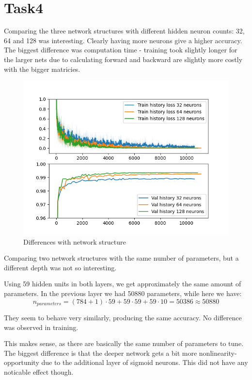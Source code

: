 \documentclass[a4paper]{article}
\begin{document}
\clearpage
\section*{Task4}
Comparing the three network structures with different hidden neuron counts: 32, 64 and 128 was interesting.
Clearly having more neurons give a higher accuracy. The biggest difference was computation time - training took slightly longer for the larger nets due to calculating forward and backward are slightly more costly with the bigger matricies.

\begin{figure}[h]
    \includegraphics[width=\linewidth]{code/neuron_count_comparison.png}
    \caption{Differences with network structure}
\end{figure}

\clearpage
Comparing two network structures with the same number of parameters, but a different depth was not so interesting.

Using 59 hidden units in both layers, we get approximately the same amount of parameters. In the previous layer we had 50880 parameters, while here we have:
$$
n_{parameters} = (784 + 1) \cdot 59 + 59 \cdot 59 + 59 \cdot 10 = 50386 \approx 50880
$$

They seem to behave very similarly, producing the same accuracy. No difference was observed in training.

This makes sense, as there are basically the same number of parameters to tune. The biggest difference is that the deeper network gets a bit more nonlinearity-opportunity due to the additional layer of sigmoid neurons. This did not have any noticable effect though.
\end{document}
